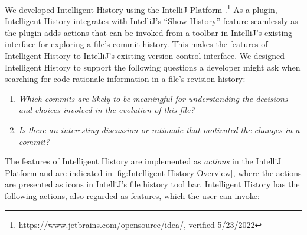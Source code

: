 We developed Intelligent History using the IntelliJ Platform .\footnote{\url{https://www.jetbrains.com/opensource/idea/}, verified 5/23/2022}
As a plugin, Intelligent History integrates with IntelliJ's ``Show History'' feature seamlessly as the plugin adds actions that can be invoked from a toolbar in IntelliJ's existing interface for exploring a file's commit history. 
This makes the features of Intelligent History  to IntelliJ's existing version control interface.
We designed Intelligent History to support the following questions a developer might ask when searching for code rationale information in a file's revision history:

\begin{enumerate}[label={(\arabic*)}]
    \item \textit{Which commits are likely to be meaningful for understanding the decisions and choices involved in the evolution of this file?}
    \item \textit{Is there an interesting discussion or rationale that motivated the changes in a commit?}
\end{enumerate}

The features of Intelligent History are implemented as \emph{actions} in the IntelliJ Platform  
and are indicated in \autoref{fig:Intelligent-History-Overview}, 
where the actions are presented as icons in IntelliJ's  file history tool bar.
Intelligent History has the following actions, also regarded as features, which the user can invoke:

